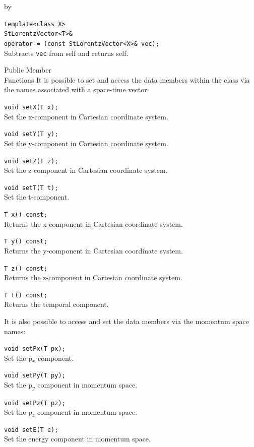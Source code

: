 \documentclass[twoside]{article}
\newcommand{\comp}[1]{\texttt{#1}}%
\newcommand{\entrylabel}[1]{\mbox{\textbf{{#1}}}\hfil}%
\newenvironment{entry}
{\begin{list}{}%
    {\renewcommand{\makelabel}{\entrylabel}%
     \setlength{\labelwidth}{90pt}%
     \setlength{\leftmargin}{\labelwidth}
     \advance\leftmargin by \labelsep%
      }%
    }%
  {\end{list}}
\newcommand{\Entrylabel}[1]%
{\raisebox{0pt}[1ex][0pt]{\makebox[\labelwidth][l]%
    {\parbox[t]{\labelwidth}{\hspace{0pt}\textbf{{#1}}}}}}
\newenvironment{Entry}%
{\renewcommand{\entrylabel}{\Entrylabel}\begin{entry}}%
  {\end{entry}}
\begin{document}
\begin{Entry}
    \verb+template<class X>+\\
    \verb+StLorentzVector<T>&+\\
    \verb+operator-= (const StLorentzVector<X>& vec);+\\
    Subtracts \comp{vec} from self and returns self.
    
\item[Public Member\\ Functions]
  It is possible to set and access the data members within the class
  via the names associated with a space-time vector:
  
    \verb+void setX(T x);+\\
    Set the x-component in Cartesian coordinate system.
    
    \verb+void setY(T y);+\\
    Set the y-component in Cartesian coordinate system.
    
    \verb+void setZ(T z);+\\
    Set the z-component in Cartesian coordinate system.
    
    \verb+void setT(T t);+\\
    Set the t-component.

    \verb+T x() const;+\\
    Returns the x-component in Cartesian coordinate system.
    
    \verb+T y() const;+\\
    Returns the y-component in Cartesian coordinate system.
    
    \verb+T z() const;+\\
    Returns the z-component in Cartesian coordinate system.

    \verb+T t() const;+\\
    Returns the temporal component.
    
    It is also possible to access and set the data members
    via the momentum space names:  
    
    \verb+void setPx(T px);+\\
    Set the p$_{x}$ component.
        
    \verb+void setPy(T py);+\\
    Set the p$_{y}$ component in momentum space.
    
    \verb+void setPz(T pz);+\\
    Set the p$_{z}$ component in momentum space.
    
    \verb+void setE(T e);+\\
    Set the energy component in momentum space.


\end{Entry}
\end{document}

